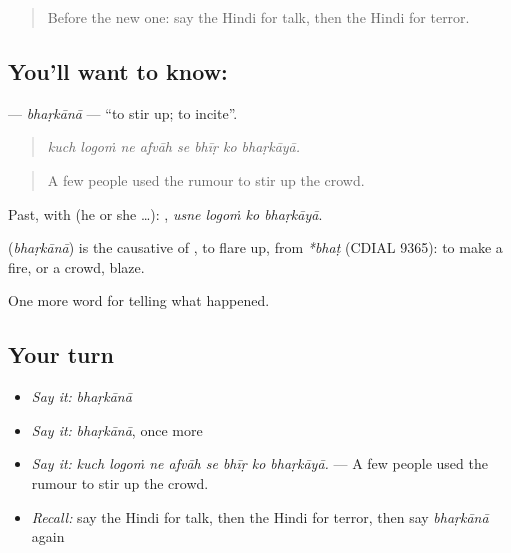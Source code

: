 \label{lesson:HI-C314-bharkana}



\begin{quote}
Before the new one: say the Hindi for talk, then the Hindi for terror.
\end{quote}

\subsection*{You'll want to know: }
\textbf{} — \emph{bhaṛkānā} — \textquotedblleft{}to stir up; to incite\textquotedblright{}.

\begin{quote}
       
\end{quote}

\begin{quote}
\emph{kuch logoṁ ne afvāh se bhīṛ ko bhaṛkāyā.}
\end{quote}

\begin{quote}
A few people used the rumour to stir up the crowd.
\end{quote}

Past, with  (he or she …):    , \emph{usne logoṁ ko bhaṛkāyā}.

\begin{cousinweb}
\textbf{} (\emph{bhaṛkānā}) is the causative of \textbf{}, to flare up, from \emph{*bhaṭ} (CDIAL 9365): to make a fire, or a crowd, blaze.
\end{cousinweb}

\begin{grammarlens}[title={What you've built}]
One more word for telling what happened.
\end{grammarlens}

\subsection*{Your turn}
\begin{itemize}
\raggedright
  \item \emph{Say it:} \emph{bhaṛkānā}
  \item \emph{Say it:} \emph{bhaṛkānā}, once more
  \item \emph{Say it:} \emph{kuch logoṁ ne afvāh se bhīṛ ko bhaṛkāyā.} — A few people used the rumour to stir up the crowd.
  \item \emph{Recall:} say the Hindi for talk, then the Hindi for terror, then say \emph{bhaṛkānā} again
\end{itemize}

